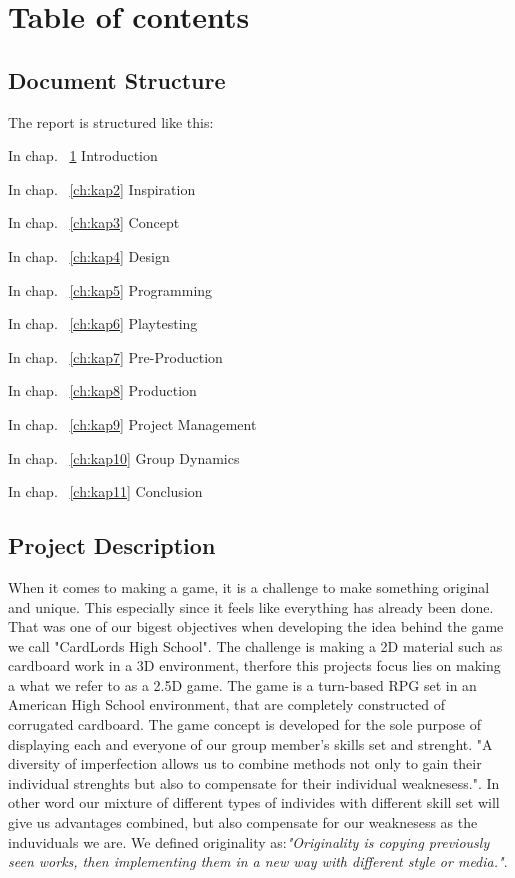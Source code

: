 \chapter{Table of contents}
\label{ch:kap1}

\section{Document Structure} 
\label{sec:struktur}

The report is structured like this:

In chap. ~\ref{ch:kap1} Introduction

In chap. ~\ref{ch:kap2} Inspiration

In chap. ~\ref{ch:kap3} Concept

In chap. ~\ref{ch:kap4} Design

In chap. ~\ref{ch:kap5} Programming

In chap. ~\ref{ch:kap6} Playtesting

In chap. ~\ref{ch:kap7} Pre-Production

In chap. ~\ref{ch:kap8} Production

In chap. ~\ref{ch:kap9} Project Management

In chap. ~\ref{ch:kap10} Group Dynamics

In chap. ~\ref{ch:kap11} Conclusion


\newpage

\section{Project Description}
\label{sec:Description}
When it comes to making a game, it is a challenge to make something original and unique. This especially since it feels like everything has already been done. That was one of our bigest objectives when developing the idea behind the game we call "CardLords High School". The challenge is making a 2D material such as cardboard work in a 3D environment, therfore this projects focus lies on making a what we refer to as a 2.5D game. The game is a turn-based RPG set in an American High School environment, that are completely constructed of corrugated cardboard. The game concept is developed for the sole purpose of displaying each and everyone of our group member's skills set and strenght. "A diversity of imperfection allows us to combine methods not only to gain their individual strenghts but also to compensate for their individual weaknesess."\cite[p.~17]{MultimethodResearch}. In other word our mixture of different types of individes with different skill set will  give us advantages combined, but also compensate for our weaknesess as the induviduals we are. We defined originality as:\textit{"Originality is copying previously seen works, then implementing them in a new way with different style or media."}.

